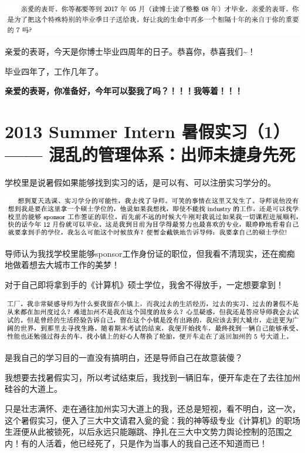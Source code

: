 \documentclass[9pt, b5paper]{article}
\begin{document}
\begin{center}
\includegraphics[width=.9\linewidth]{./pic/backups_plans_20210506_205646.png}
\end{center}

亲爱的表哥，今天是你博士毕业四周年的日子。恭喜你，恭喜我们\textasciitilde{}！

毕业四年了，工作几年了。

\textbf{亲爱的表哥，你准备好，今年可以娶我了吗？！！！我等着！！！}

\section{2013 Summer Intern 暑假实习（1） —— 混乱的管理体系：出师未捷身先死}
\label{sec:orgf2e7b2f}

学校里是说暑假如果能够找到实习的话，是可以有、可以注册实习学分的。 

\begin{center}
\includegraphics[width=.9\linewidth]{./pic/backups_plans_20210424_220153.png}
\end{center}

导师认为我找学校里能够sponsor工作身份证的职位，但我看不清现实，还在痴痴地做着想去大城市工作的美梦！

对于自己即将拿到手的《计算机》硕士学位，我舍不得放手，一定想要拿到！

\begin{center}
\includegraphics[width=.9\linewidth]{./pic/backups_plans_20210424_220214.png}
\end{center}

是我自己的学习目的一直没有搞明白，还是导师自己在故意装傻？

我想要去找暑假实习，所以考试结束后，我找到一辆旧车，便开车走在了去往加州硅谷的大道上。 

只是壮志满怀、走在通往加州实习大道上的我，还总是短视，看不明白，这一次，这个暑假实习，便入了三大中文请君入瓮的瓮：我的神等级专业《计算机》的职场生涯便从此被锁死，以后永远只能蹦跳、挣扎在三大中文势力舆论控制的范围之内！有的人活着，他已经死了，只是作为当事人的我自己还不知道而已！
\end{document}
